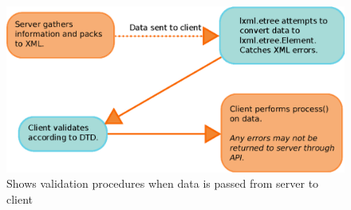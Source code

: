 \begin{figure}[h!]
    \includegraphics[width=\textwidth]{img/server_information_flow}
    \caption{Shows validation procedures when data is passed from server to
    client}
    \label{fig:server_information_flow}
\end{figure}
